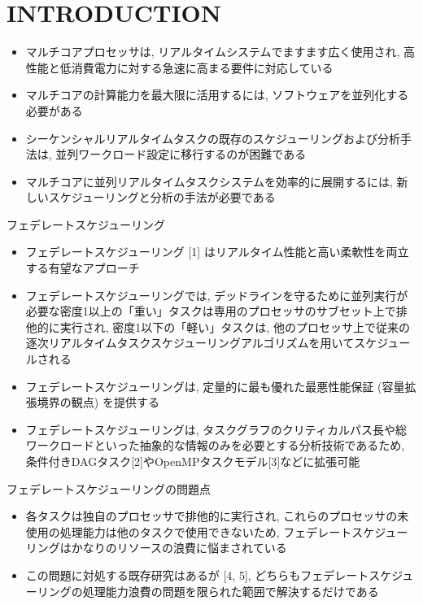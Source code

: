 
\section{INTRODUCTION}
\label{sec: introduction}

\begin{frame}{}
    \begin{itemize}
        \item マルチコアプロセッサは, リアルタイムシステムでますます広く使用され, 高性能と低消費電力に対する急速に高まる要件に対応している
        \item マルチコアの計算能力を最大限に活用するには, ソフトウェアを並列化する必要がある
        \item シーケンシャルリアルタイムタスクの既存のスケジューリングおよび分析手法は, 並列ワークロード設定に移行するのが困難である
        \item マルチコアに並列リアルタイムタスクシステムを効率的に展開するには, 新しいスケジューリングと分析の手法が必要である
    \end{itemize}
\end{frame}

\begin{frame}{フェデレートスケジューリング}
    \begin{itemize}
        \item フェデレートスケジューリング [1] はリアルタイム性能と高い柔軟性を両立する有望なアプローチ
        \item フェデレートスケジューリングでは, デッドラインを守るために並列実行が必要な密度1以上の「重い」タスクは専用のプロセッサのサブセット上で排他的に実行され, 密度1以下の「軽い」タスクは, 他のプロセッサ上で従来の逐次リアルタイムタスクスケジューリングアルゴリズムを用いてスケジュールされる
        \item フェデレートスケジューリングは, 定量的に最も優れた最悪性能保証 (容量拡張境界の観点) を提供する
        \item フェデレートスケジューリングは, タスクグラフのクリティカルパス長や総ワークロードといった抽象的な情報のみを必要とする分析技術であるため, 条件付きDAGタスク[2]やOpenMPタスクモデル[3]などに拡張可能
    \end{itemize}
\end{frame}

\begin{frame}{フェデレートスケジューリングの問題点}
    \begin{itemize}
        \item 各タスクは独自のプロセッサで排他的に実行され, これらのプロセッサの未使用の処理能力は他のタスクで使用できないため, フェデレートスケジューリングはかなりのリソースの浪費に悩まされている
        \item この問題に対処する既存研究はあるが [4, 5], どちらもフェデレートスケジューリングの処理能力浪費の問題を限られた範囲で解決するだけである
    \end{itemize}
\end{frame}

